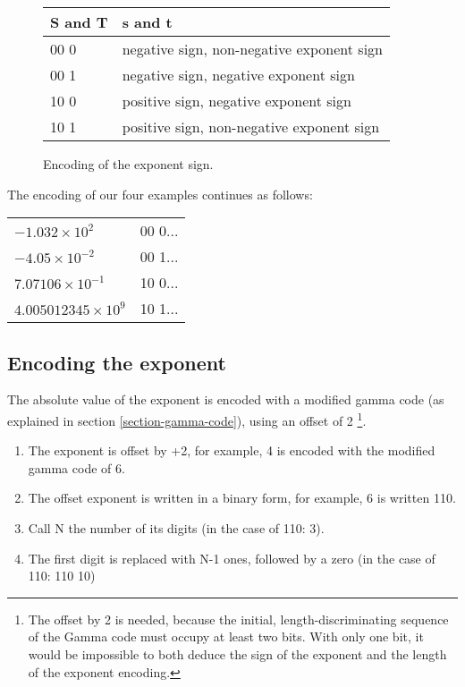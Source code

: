 \documentclass{acm_proc_article-sp}
\begin{document}
\begin{figure}[p]
\caption{Encoding of the exponent sign.}
\label{figure-exponent-sign}
\center
\begin{tabular}{|l|l|}
\hline
S and T & s and t \\
\hline
00 0 &  negative sign, non-negative exponent sign\\
\hline
00 1 & negative sign, negative exponent sign\\
\hline
10 0 & positive sign, negative exponent sign\\
\hline
10 1 & positive sign, non-negative exponent sign\\
\hline
\end{tabular}
\end{figure}

The encoding of our four examples continues as follows:

\begin{tabular}{l|l}
$- 1.032 \times 10^2$ & 00 0... \\

$-4.05 \times 10^{-2}$ & 00 1... \\

$7.07106 \times 10^{-1}$ & 10 0... \\

$4.005012345 \times 10^9$ & 10 1...\\
\end{tabular}

\vspace{10pt}
\subsection{Encoding the exponent}

The absolute value of the exponent is encoded with a modified gamma code (as explained in section \ref{section-gamma-code}), using an offset of 2 \footnote{The offset by 2 is needed, because the initial, length-discriminating sequence of the Gamma code must occupy at least two bits. With only one bit, it would be impossible to both deduce the sign of the exponent and the length of the exponent encoding.}.

\label{section-exponent-encoding}
\begin{enumerate}
\item The exponent is offset by +2, for example, 4 is encoded with the modified gamma code of 6. 
\item  The offset exponent is written in a binary form, for example, 6 is written 110.
\item  Call N the number of its digits (in the case of 110: 3).
\item  The first digit is replaced with N-1 ones, followed by a zero (in the case of 110: 110 10)
\end{enumerate}
\end{document}
